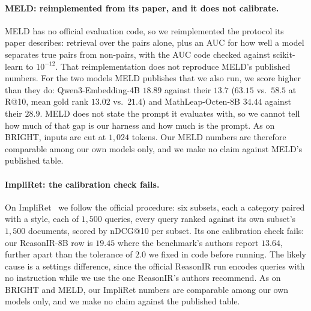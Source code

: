 \paragraph{MELD: reimplemented from its paper, and it does not calibrate.}
MELD has no official evaluation code, so we reimplemented the protocol its paper describes: retrieval over the pairs alone, plus an AUC for how well a model separates true pairs from non-pairs, with the AUC code checked against scikit-learn to $10^{-12}$. That reimplementation does not reproduce MELD's published numbers. For the two models MELD publishes that we also run, we score higher than they do: Qwen3-Embedding-4B $18.89$ against their $13.7$ ($63.15$ vs.\ $58.5$ at R@10, mean gold rank $13.02$ vs.\ $21.4$) and MathLeap-Octen-8B $34.44$ against their $28.9$. MELD does not state the prompt it evaluates with, so we cannot tell how much of that gap is our harness and how much is the prompt. As on BRIGHT, inputs are cut at $1{,}024$ tokens. Our MELD numbers are therefore comparable among our own models only, and we make no claim against MELD's published table.

\paragraph{ImpliRet: the calibration check fails.}On ImpliRet~\citep{taghavi2025impliret} we follow the official procedure: six subsets, each a category paired with a style, each of $1{,}500$ queries, every query ranked against its own subset's $1{,}500$ documents, scored by nDCG@10 per subset. Its one calibration check fails: our ReasonIR-8B row is $19.45$ where the benchmark's authors report $13.64$, further apart than the tolerance of $2.0$ we fixed in code before running. The likely cause is a settings difference, since the official ReasonIR run encodes queries with no instruction while we use the one ReasonIR's authors recommend. As on BRIGHT and MELD, our ImpliRet numbers are comparable among our own models only, and we make no claim against the published table.


